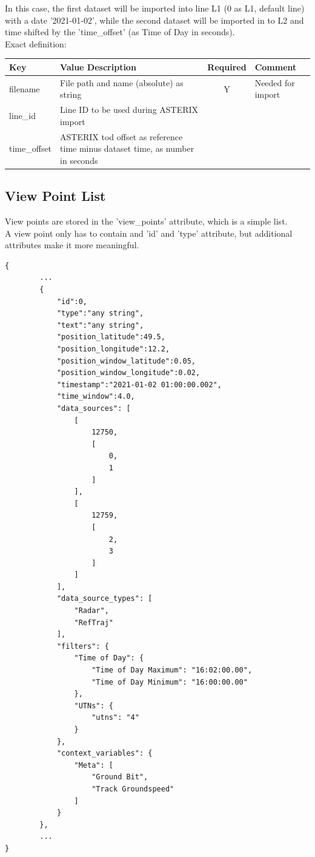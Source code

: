 In this case, the first dataset will be imported into line L1 (0 as L1, default line) with a date '2021-01-02', 
while the second dataset will be imported in to L2 and time shifted by the 'time\_offset' (as Time of Day in seconds). \\

Exact definition:

\begin{center}
 \begin{table}[H]
  \begin{tabularx}{\textwidth}{ | l | X | c | X | }
    \hline
    \textbf{Key} & \textbf{Value Description} & \textbf{Required} & \textbf{Comment} \\ \hline
    filename & File path and name (absolute) as string & Y & Needed for import \\ \hline
    line\_id & Line ID to be used during ASTERIX import & & \\ \hline
    time\_offset & ASTERIX tod offset as reference time minus dataset time, as number in seconds & & \\ \hline
\end{tabularx}
\end{table}
\end{center}

\subsection{View Point List}

View points are stored in the 'view\_points' attribute, which is a simple list. \\

A view point only has to contain and 'id' and 'type' attribute, but additional attributes make it more meaningful.

\begin{lstlisting}[basicstyle=\small\ttfamily]
{
        ...
        {
            "id":0,
            "type":"any string",
            "text":"any string",
            "position_latitude":49.5,
            "position_longitude":12.2,
            "position_window_latitude":0.05,
            "position_window_longitude":0.02,
            "timestamp":"2021-01-02 01:00:00.002",
            "time_window":4.0,
            "data_sources": [
                [
                    12750,
                    [
                        0,
                        1
                    ]
                ],
                [
                    12759,
                    [
                        2,
                        3
                    ]
                ]
            ],
            "data_source_types": [
                "Radar",
                "RefTraj"
            ],
            "filters": {
                "Time of Day": {
                    "Time of Day Maximum": "16:02:00.00",
                    "Time of Day Minimum": "16:00:00.00"
                },
                "UTNs": {
                    "utns": "4"
                }
            },
            "context_variables": {
                "Meta": [
                    "Ground Bit",
                    "Track Groundspeed"
                ]
            }
        },
        ...
}
\end{lstlisting}

